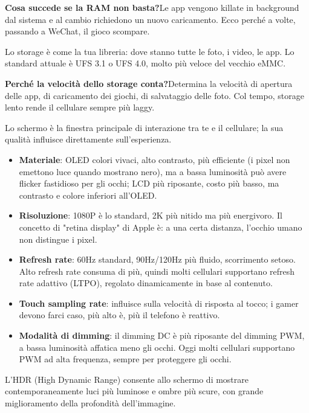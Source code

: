 \textbf{Cosa succede se la RAM non basta?}Le app vengono killate in background dal sistema e al cambio richiedono un nuovo caricamento. Ecco perché a volte, passando a WeChat, il gioco scompare.


Lo storage è come la tua libreria: dove stanno tutte le foto, i video, le app. Lo standard attuale è UFS 3.1 o UFS 4.0, molto più veloce del vecchio eMMC.

\textbf{Perché la velocità dello storage conta?}Determina la velocità di apertura delle app, di caricamento dei giochi, di salvataggio delle foto. Col tempo, storage lento rende il cellulare sempre più laggy.


Lo schermo è la finestra principale di interazione tra te e il cellulare; la sua qualità influisce direttamente sull'esperienza.

\begin{itemize}
  \item \textbf{Materiale}: OLED colori vivaci, alto contrasto, più efficiente (i pixel non emettono luce quando mostrano nero), ma a bassa luminosità può avere flicker fastidioso per gli occhi; LCD più riposante, costo più basso, ma contrasto e colore inferiori all'OLED.
  \item \textbf{Risoluzione}: 1080P è lo standard, 2K più nitido ma più energivoro. Il concetto di "retina display" di Apple è: a una certa distanza, l'occhio umano non distingue i pixel.
  \item \textbf{Refresh rate}: 60Hz standard, 90Hz/120Hz più fluido, scorrimento setoso. Alto refresh rate consuma di più, quindi molti cellulari supportano refresh rate adattivo (LTPO), regolato dinamicamente in base al contenuto.
  \item \textbf{Touch sampling rate}: influisce sulla velocità di risposta al tocco; i gamer devono farci caso, più alto è, più il telefono è reattivo.
  \item \textbf{Modalità di dimming}: il dimming DC è più riposante del dimming PWM, a bassa luminosità affatica meno gli occhi. Oggi molti cellulari supportano PWM ad alta frequenza, sempre per proteggere gli occhi.
\end{itemize}


L'HDR (High Dynamic Range) consente allo schermo di mostrare contemporaneamente luci più luminose e ombre più scure, con grande miglioramento della profondità dell'immagine.

